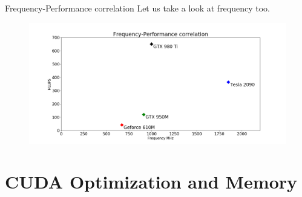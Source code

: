 \documentclass[9pt]{beamer}
\begin{document}
\begin{frame}{Frequency-Performance correlation}
Let us take a look at frequency too. 
\begin{figure}
\begin{center}
	\includegraphics[scale=0.25]{images/freq_mlups_corr.png}
\end{center}
\end{figure}
\end{frame}



\section{CUDA Optimization and Memory}
\end{document}
